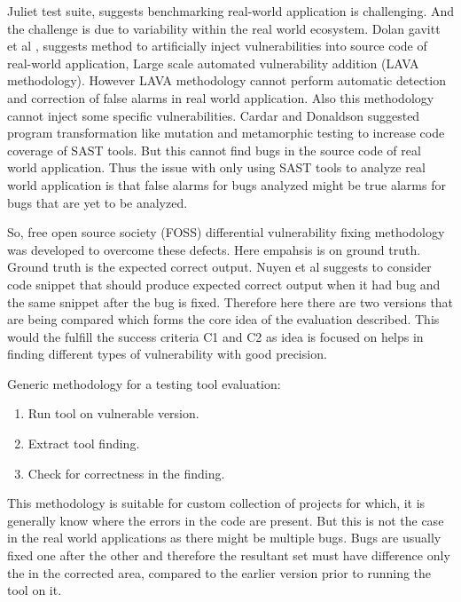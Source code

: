 \documentclass[authoryear,preprint]{sigplanconf}
\begin{document}
Juliet test suite, suggests benchmarking real-world application is challenging. And the challenge is due to variability within the real world ecosystem. Dolan gavitt et al \cite{7546498}, suggests method to artificially inject vulnerabilities into source code of real-world application, Large scale automated vulnerability addition (LAVA methodology). However LAVA methodology cannot perform automatic detection and correction of false alarms in real world application. Also this methodology cannot inject some specific vulnerabilities. Cardar and Donaldson \cite{Cadar:2016:APA:2889160.2889206} suggested program transformation like mutation and metamorphic testing to increase code coverage of SAST tools. But this cannot find bugs in the source code of  real world application. Thus the issue with only using SAST tools to analyze real world application is that false alarms for bugs analyzed might be true alarms for bugs that are yet to be analyzed.

So, free open source society (FOSS) \cite{Pashchenko:2017:FVD:3106237.3121276} differential vulnerability fixing methodology was developed to overcome these defects. Here empahsis is on ground truth. Ground truth is the expected correct output. Nuyen et al \cite{Do:2016:TAB:2931021.2931023} suggests to consider code snippet that should produce expected correct output when it had bug and the same snippet after the bug is fixed. Therefore here there are two versions that are being compared which forms the core idea of the evaluation described. This would the fulfill the success criteria C1 and C2 as idea is focused on helps in finding different types of vulnerability with good precision.

Generic methodology for a testing tool evaluation: 
\begin{enumerate}
	\item Run tool on vulnerable version.
	\item Extract tool finding.
	\item Check for correctness in the finding.
\end{enumerate}

This methodology is suitable for custom collection of projects for which, it is generally know where the errors in the code are present. But this is not the case in the real world applications as there might be multiple bugs. Bugs are usually fixed one after the other and therefore the resultant set must have difference only the in the corrected area, compared to the earlier version prior to running the tool on it. 
\end{document}

